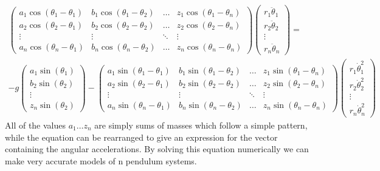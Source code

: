 \documentclass{article}
\begin{document}
\begin{multline*}
\begin{pmatrix}
a_{1} \cos(\theta_{1} - \theta_{1}) & b_{1} \cos(\theta_{1} - \theta_{2}) & \dots & z_{1} \cos(\theta_{1} - \theta_{n}) \\
a_{2} \cos(\theta_{2} - \theta_{1}) & b_{2} \cos(\theta_{2} - \theta_{2}) & \dots & z_{2} \cos(\theta_{2} - \theta_{n}) \\
\vdots & \vdots & \ddots & \vdots \\
a_{n} \cos(\theta_{n} - \theta_{1}) & b_{n} \cos(\theta_{n} - \theta_{2}) & \dots & z_{n} \cos(\theta_{n} - \theta_{n})
\end{pmatrix}
\begin{pmatrix}
r_{1} \ddot{\theta}_{1} \\ r_{2} \ddot{\theta}_{2} \\ \vdots \\  r_{n} \ddot{\theta}_{n}
\end{pmatrix}
= \\ -g
\begin{pmatrix}
a_{1} \sin(\theta_{1}) \\ b_{2} \sin(\theta_{2}) \\ \vdots \\ z_{n} \sin(\theta_{2})
\end{pmatrix}
 - 
\begin{pmatrix}
a_{1} \sin(\theta_{1} - \theta_{1}) & b_{1} \sin(\theta_{1} - \theta_{2}) & \dots & z_{1} \sin(\theta_{1} - \theta_{n}) \\
a_{2} \sin(\theta_{2} - \theta_{1}) & b_{2} \sin(\theta_{2} - \theta_{2}) & \dots & z_{2} \sin(\theta_{2} - \theta_{n}) \\
\vdots & \vdots & \ddots & \vdots \\
a_{n} \sin(\theta_{n} - \theta_{1}) & b_{n} \sin(\theta_{n} - \theta_{2}) & \dots & z_{n} \sin(\theta_{n} - \theta_{n})
\end{pmatrix}
\begin{pmatrix}
r_{1} \dot{\theta}_{1}^2 \\ r_{2} \dot{\theta}_{2}^2 \\ \vdots \\  r_{n} \dot{\theta}_{n}^2
\end{pmatrix}
\end{multline*}
 All of the values \( a_{1} \dots z_{n} \) are simply sums of masses which follow a simple pattern, while the equation can be rearranged to give an expression for the vector containing the angular accelerations. By solving this equation numerically we can make very accurate models of n pendulum systems.
\end{document}
